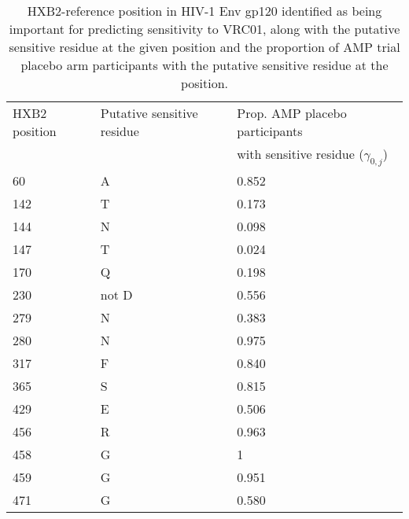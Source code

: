 \documentclass[10pt]{article}
\begin{document}
\begin{table}
  \centering
  \caption{HXB2-reference position in HIV-1 Env gp120 identified as being important for predicting sensitivity to VRC01, along with the putative sensitive residue at the given position and the proportion of AMP trial placebo arm participants with the putative sensitive residue at the position.}
  \label{tab:sens}
  \begin{tabular}{lll}
    HXB2 position & Putative sensitive residue & Prop. AMP placebo participants \\
                  &                            & with sensitive residue ($\gamma_{0,j}$)\\
    \hline
    60 & A & 0.852 \\
    142 & T & 0.173 \\
    144 & N & 0.098 \\
    147 & T & 0.024 \\
    170 & Q & 0.198 \\
    230 & not D & 0.556 \\
    279 & N & 0.383 \\
    280 & N & 0.975 \\
    317 & F & 0.840 \\
    365 & S & 0.815 \\
    429 & E & 0.506 \\
    456 & R & 0.963 \\
    458 & G & 1 \\
    459 & G & 0.951 \\
    471 & G & 0.580 \\
  \end{tabular}
\end{table}
\end{document}
